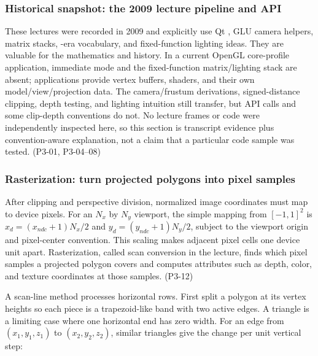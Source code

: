 \subsubsection{Historical snapshot: the 2009 lecture pipeline and API}\label{03-visual-computing-i-ch018-historical-snapshot-the-2009-lecture-pipeline-and-api-1}

\hypertarget{03-visual-computing-i-ch018-historical-snapshot-the-2009-lecture-pipeline-and-api-1}{}

These lectures were recorded in 2009 and explicitly use Qt , GLU camera helpers, matrix stacks, -era vocabulary, and fixed-function lighting ideas. They are valuable for the mathematics and history. In a current OpenGL core-profile application, immediate mode and the fixed-function matrix/lighting stack are absent; applications provide vertex buffers, shaders, and their own model/view/projection data. The camera/frustum derivations, signed-distance clipping, depth testing, and lighting intuition still transfer, but API calls and some clip-depth conventions do not. No lecture frames or code were independently inspected here, so this section is transcript evidence plus convention-aware explanation, not a claim that a particular code sample was tested. (P3-01, P3-04--08)

\subsubsection{Rasterization: turn projected polygons into pixel samples}\label{03-visual-computing-i-ch018-rasterization-turn-projected-polygons-into-pixel-samples}

\hypertarget{03-visual-computing-i-ch018-rasterization-turn-projected-polygons-into-pixel-samples}{}

After clipping and perspective division, normalized image coordinates must map to device pixels. For an \(N_x\) by \(N_y\) viewport, the simple mapping from \([-1,1]^2\) is \(x_d=(x_{ndc}+1)N_x/2\) and \(y_d=(y_{ndc}+1)N_y/2\), subject to the viewport origin and pixel-center convention. This scaling makes adjacent pixel cells one device unit apart. Rasterization, called scan conversion in the lecture, finds which pixel samples a projected polygon covers and computes attributes such as depth, color, and texture coordinates at those samples. (P3-12)

A scan-line method processes horizontal rows. First split a polygon at its vertex heights so each piece is a trapezoid-like band with two active edges. A triangle is a limiting case where one horizontal end has zero width. For an edge from \((x_1,y_1,z_1)\) to \((x_2,y_2,z_2)\), similar triangles give the change per unit vertical step:


